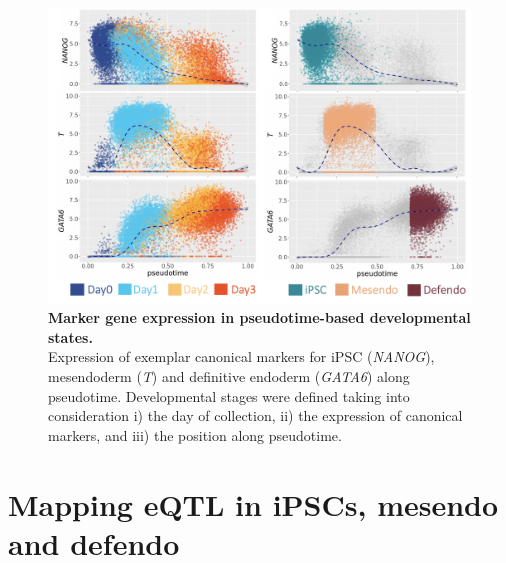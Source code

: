 \begin{figure}[h]
\centering
\includegraphics[width=14cm]{Chapter4/Fig/endodiff_stages.png}
\caption[Developmental stages]{\textbf{Marker gene expression in pseudotime-based developmental states.}\\
Expression of exemplar canonical markers for iPSC (\textit{NANOG}), mesendoderm (\textit{T}) and definitive endoderm (\textit{GATA6}) along pseudotime.
Developmental stages were defined taking into consideration i) the day of collection, ii) the expression of canonical markers, and iii) the position along pseudotime.}
\label{fig:endodiff_stages}
\end{figure}

\section{Mapping eQTL in iPSCs, mesendo and defendo}
\label{sec:endodiff_eqtl}

